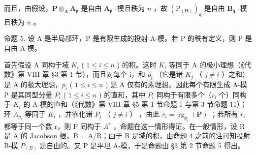 而且，由假设，\(\mathbf{P} \otimes_{\mathbf{A}} \mathbf{A}_{\mathfrak{p}}\) 是自由 \(\mathbf{A}_{\mathfrak{p}}\) -模且秩为 \(n\) ，故 \((\mathrm{P}_{(\mathbf{B})})_{\mathfrak{q}}\) 是自由 \(\mathbf{B}_{\mathfrak{q}}\) -模且秩为 \(n\) 。

命题 5. 设 A 是半局部环，P 是有限生成的投射 A-模。若 P 的秩有定义，则 P 是自由 A-模。

首先假设 A 同构于域 \(K_{i}\) ( \(1 \leqslant i \leqslant n\) ) 的积。这时 \(K_{i}\) 等同于 A 的极小理想（《代数》第 VIII 章 §3 第 1 节），而且对每个 i，和 \(p_{i}\) （它是诸 \(K_{j}\) （ \(j \neq i\) ）之和）是 A 的极大理想，\(p_{i}\) ( \(1 \leqslant i \leqslant n\) ) 是 A 仅有的素理想。因此每个有限生成 A-模 P 是其同型分量 \(P_{i}\) ( \(1 \leqslant i \leqslant n\) ) 的直和，其中 \(P_{i}\) 同构于有限多个（\(r_{i}\) 个）同构于 \(K_{i}\) 的 A-模的直和（《代数》第 VIII 章 §5 第 1 节命题 1 与第 3 节命题 11）；环 \(A_{p_{i}}\) 等同于 \(K_{i}\) ，并零化诸 \(P_{j}\) （ \(j \neq i\) ） ，由此 \(r_{i} = \operatorname{rg}_{\mathfrak{p}_{i}}(\mathbf{P})\) ；若所有 \(r_{i}\) 都等于同一个数 r，则 P 同构于 \(A^{r}\) ，命题在这一情形得证。在一般情形，设 R 是 A 的 Jacobson 根，B = A/R；由于 B 是域的积，由命题 4 之前的注可知投射 B-模 \(P_{(B)}\) 是自由的。又 P 是平坦 A-模，于是命题由 §3 第 2 节命题 5 得出。

